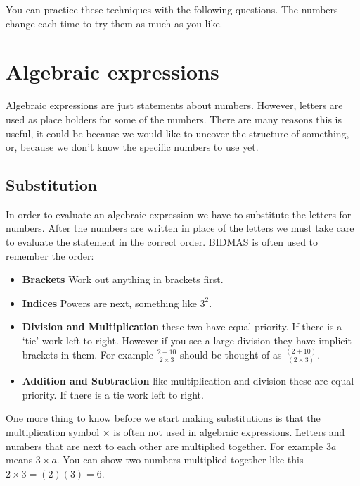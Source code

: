 \documentclass[
  a4paper,
]{scrbook}
\providecommand{\tightlist}{%
  \setlength{\itemsep}{0pt}\setlength{\parskip}{0pt}}
\begin{document}
You can practice these techniques with the following questions. The
numbers change each time to try them as much as you like.


\chapter{Algebraic expressions}\label{algebraic-expressions}

Algebraic expressions are just statements about numbers. However,
letters are used as place holders for some of the numbers. There are
many reasons this is useful, it could be because we would like to
uncover the structure of something, or, because we don't know the
specific numbers to use yet.

\section{Substitution}\label{substitution}

In order to evaluate an algebraic expression we have to substitute the
letters for numbers. After the numbers are written in place of the
letters we must take care to evaluate the statement in the correct
order. BIDMAS is often used to remember the order:

\begin{itemize}
\tightlist
\item
  \textbf{Brackets} Work out anything in brackets first.
\item
  \textbf{Indices} Powers are next, something like \(3^2\).
\item
  \textbf{Division and Multiplication} these two have equal priority. If
  there is a `tie' work left to right. However if you see a large
  division they have implicit brackets in them. For example
  \(\frac{2 + 10}{2 \times 3}\) should be thought of as
  \(\frac{(2 + 10)}{(2 \times 3)}\).
\item
  \textbf{Addition and Subtraction} like multiplication and division
  these are equal priority. If there is a tie work left to right.
\end{itemize}

One more thing to know before we start making substitutions is that the
multiplication symbol \(\times\) is often not used in algebraic
expressions. Letters and numbers that are next to each other are
multiplied together. For example \(3a\) means \(3 \times a\). You can
show two numbers multiplied together like this
\(2 \times 3 = (2)(3) = 6\).
\end{document}
